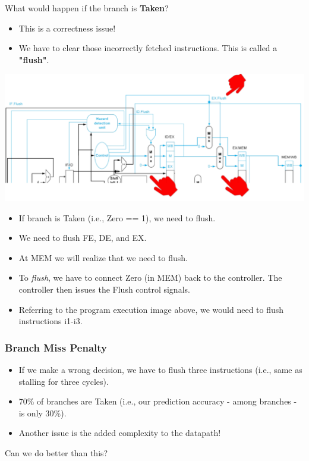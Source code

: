 \documentclass[10pt]{article}
\begin{document}
What would happen if the branch is \textbf{Taken}?
\begin{itemize}
    \item This is a correctness issue!
    \item We have to clear those incorrectly fetched instructions.  This is called a \textbf{"flush"}.
\end{itemize}
\begin{center}
    \includegraphics*[scale=0.4]{W3_18.png}
\end{center}
\begin{itemize}
    \item If branch is Taken (i.e., Zero == 1), we need to flush.
    \item We need to flush FE, DE, and EX.
    \item At MEM we will realize that we need to flush.
    \item To \textit{flush}, we have to connect Zero (in MEM) back to the controller.  The controller then issues the Flush control signals.
    \item Referring to the program execution image above, we would need to flush instructions i1-i3.
\end{itemize}

\subsubsection*{Branch Miss Penalty}
\begin{itemize}
    \item If we make a wrong decision, we have to flush three instructions (i.e., same as stalling for three cycles).
    \item 70\% of branches are Taken (i.e., our prediction accuracy - among branches - is only 30\%).
    \item Another issue is the added complexity to the datapath!
\end{itemize}
Can we do better than this?
\end{document}
